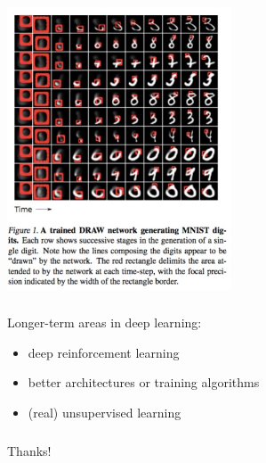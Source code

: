 \documentclass[xetex,mathserif,serif,aspectratio=169]{beamer}
\begin{document}
\begin{frame}[fragile] \frametitle{} \oldB \small

\begin{center}
\includegraphics[width=0.5\textwidth]{img/draw.jpg}
\end{center}

\end{frame}

\begin{frame}[fragile] \frametitle{} \oldB \large

Longer-term areas in deep learning:
\begin{itemize}
\item deep reinforcement learning
\item better architectures or training algorithms
\item (real) unsupervised learning
\end{itemize}

\end{frame}

\begin{frame}[fragile] \frametitle{} \oldB \small

\begin{center}
{\color{yaleblue}\sc\fontsize{2cm}{0cm}\selectfont Thanks!}
\end{center}

\end{frame}
\end{document}
